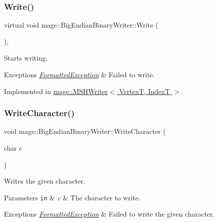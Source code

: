 \subsubsection{\texorpdfstring{Write()}{Write()}}
{\footnotesize\ttfamily virtual void mage\+::\+Big\+Endian\+Binary\+Writer\+::\+Write (\begin{DoxyParamCaption}{ }\end{DoxyParamCaption})\hspace{0.3cm}{\ttfamily [private]}, {}}

Starts writing.


\begin{DoxyExceptions}{Exceptions}
{\em \hyperlink{structmage_1_1_formatted_exception}{Formatted\+Exception}} & Failed to write. \\
\hline
\end{DoxyExceptions}


Implemented in \hyperlink{classmage_1_1_m_s_h_writer_ab97c9570c45bff97d88700d0dcf3ed75}{mage\+::\+M\+S\+H\+Writer$<$ Vertex\+T, Index\+T $>$}.

\hypertarget{classmage_1_1_big_endian_binary_writer_a869eff3f6e0666406bd5470af3e02096}{}\label{classmage_1_1_big_endian_binary_writer_a869eff3f6e0666406bd5470af3e02096} 
\subsubsection{\texorpdfstring{Write\+Character()}{WriteCharacter()}}
{\footnotesize\ttfamily void mage\+::\+Big\+Endian\+Binary\+Writer\+::\+Write\+Character (\begin{DoxyParamCaption}\item[{char}]{c }\end{DoxyParamCaption})\hspace{0.3cm}{\ttfamily [protected]}}

Writes the given character.


\begin{DoxyParams}[1]{Parameters}
\mbox{\tt in}  & {\em c} & The character to write. \\
\hline
\end{DoxyParams}

\begin{DoxyExceptions}{Exceptions}
{\em \hyperlink{structmage_1_1_formatted_exception}{Formatted\+Exception}} & Failed to write the given character. \\
\hline
\end{DoxyExceptions}
\hypertarget{classmage_1_1_big_endian_binary_writer_a1a62be10de26eb77e1812e6807eb4c02}{}\label{classmage_1_1_big_endian_binary_writer_a1a62be10de26eb77e1812e6807eb4c02} 
